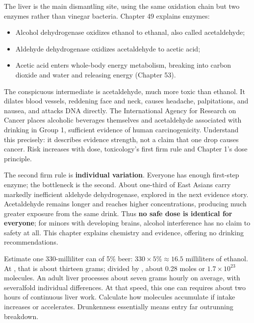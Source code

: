 The liver is the main dismantling site, using the same oxidation chain but two enzymes rather than vinegar bacteria. Chapter 49 explains enzymes:

\begin{itemize}[itemsep=2pt]
\item Alcohol dehydrogenase oxidizes ethanol to ethanal, also called acetaldehyde;
\item Aldehyde dehydrogenase oxidizes acetaldehyde to acetic acid;
\item Acetic acid enters whole-body energy metabolism, breaking into carbon dioxide and water and releasing energy (Chapter 53).
\end{itemize}

The conspicuous intermediate is acetaldehyde, much more toxic than ethanol. It dilates blood vessels, reddening face and neck, causes headache, palpitations, and nausea, and attacks DNA directly. The International Agency for Research on Cancer places alcoholic beverages themselves and acetaldehyde associated with drinking in Group 1, sufficient evidence of human carcinogenicity. Understand this precisely: it describes evidence strength, not a claim that one drop causes cancer. Risk increases with dose, toxicology's first firm rule and Chapter 1's dose principle.

The second firm rule is \textbf{individual variation}. Everyone has enough first-step enzyme; the bottleneck is the second. About one-third of East Asians carry markedly inefficient aldehyde dehydrogenase, explored in the next evidence story. Acetaldehyde remains longer and reaches higher concentrations, producing much greater exposure from the same drink. Thus \textbf{no safe dose is identical for everyone}; for minors with developing brains, alcohol interference has no claim to safety at all. This chapter explains chemistry and evidence, offering no drinking recommendations.

\begin{qiaoliang}
Estimate one 330-milliliter can of 5\% beer: $330\times 5\% \approx 16.5$ milliliters of ethanol. At , that is about thirteen grams; divided by , about 0.28 moles or $1.7\times 10^{23}$ molecules. An adult liver processes about seven grams hourly on average, with severalfold individual differences. At that speed, this one can requires about two hours of continuous liver work. Calculate how molecules accumulate if intake increases or accelerates. Drunkenness essentially means entry far outrunning breakdown.
\end{qiaoliang}

